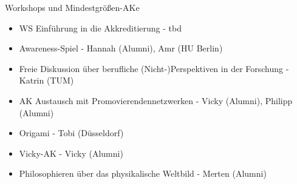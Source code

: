 \begin{frame}{Workshops und Mindestgrößen-AKe}
	\begin{itemize}
		\item WS Einführung in die Akkreditierung - tbd
		\item Awareness-Spiel - Hannah (Alumni), Amr (HU Berlin)
	\end{itemize}
	\vspace{.5 cm}
	\begin{itemize}
		\item Freie Diskussion über berufliche (Nicht-)Perspektiven in der Forschung - Katrin (TUM)
		\item AK Austausch mit Promovierendennetzwerken - Vicky (Alumni), Philipp (Alumni)
		\item Origami - Tobi (Düsseldorf)
		\item Vicky-AK - Vicky (Alumni)
		\item Philosophieren über das physikalische Weltbild - Merten (Alumni)
	\end{itemize}
\end{frame}
